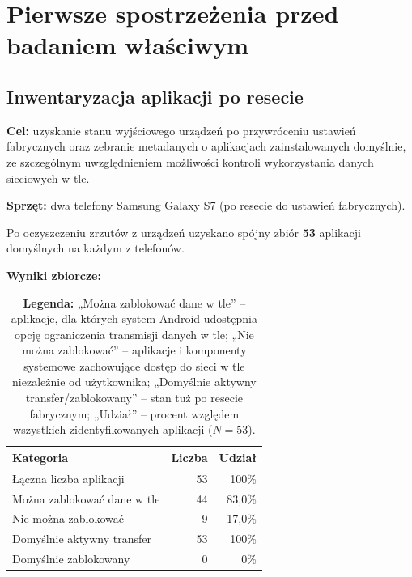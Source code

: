 \chapter{Pierwsze spostrzeżenia przed badaniem właściwym}

\section{Inwentaryzacja aplikacji po resecie}

\textbf{Cel:} uzyskanie stanu wyjściowego urządzeń po przywróceniu ustawień fabrycznych oraz zebranie metadanych o aplikacjach zainstalowanych domyślnie, ze szczególnym uwzględnieniem możliwości kontroli wykorzystania danych sieciowych w tle.

\textbf{Sprzęt:} dwa telefony Samsung Galaxy S7 (po resecie do ustawień fabrycznych).

Po oczyszczeniu zrzutów z urządzeń uzyskano spójny zbiór \textbf{53} aplikacji domyślnych na każdym z telefonów.

\textbf{Wyniki zbiorcze:}
\begin{table}[htbp]
  \centering
  \caption{Podsumowanie ustawień korzystania z danych sieciowych w tle (po resecie)}
  \label{tab:default-apps-summary}
  \begin{tabular}{lrr}
    \toprule
    \textbf{Kategoria} & \textbf{Liczba} & \textbf{Udział} \\
    \midrule
    Łączna liczba aplikacji      & 53 & 100\% \\
    Można zablokować dane w tle  & 44 & 83{,}0\% \\
    Nie można zablokować         & 9  & 17{,}0\% \\
    Domyślnie aktywny transfer   & 53 & 100\% \\
    Domyślnie zablokowany        & 0  & 0\% \\
    \bottomrule
  \end{tabular}
  \captionsetup{justification=raggedright,singlelinecheck=false}
  \caption*{\footnotesize
  \textbf{Legenda:} 
  „Można zablokować dane w tle” – aplikacje, dla których system Android udostępnia opcję ograniczenia transmisji danych w tle; 
  „Nie można zablokować” – aplikacje i komponenty systemowe zachowujące dostęp do sieci w tle niezależnie od użytkownika; 
  „Domyślnie aktywny transfer/zablokowany” – stan tuż po resecie fabrycznym; 
  „Udział” – procent względem wszystkich zidentyfikowanych aplikacji ($N=53$).
  }
\end{table}

